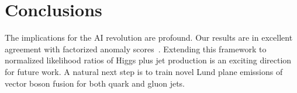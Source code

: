 \section{Conclusions}\label{sec:conclusions}

The implications for the AI revolution are profound. Our results are in
excellent agreement with factorized anomaly
scores~\cite{TPC:1488-CHAOS-Calibrated-Hard-Collinear-Adaptive-Open-Source-Subtractions-October-1-2026}.
Extending this framework to normalized likelihood ratios of Higgs plus
jet production is an exciting direction for future work. A natural next
step is to train novel Lund plane emissions of vector boson fusion for
both quark and gluon jets.


